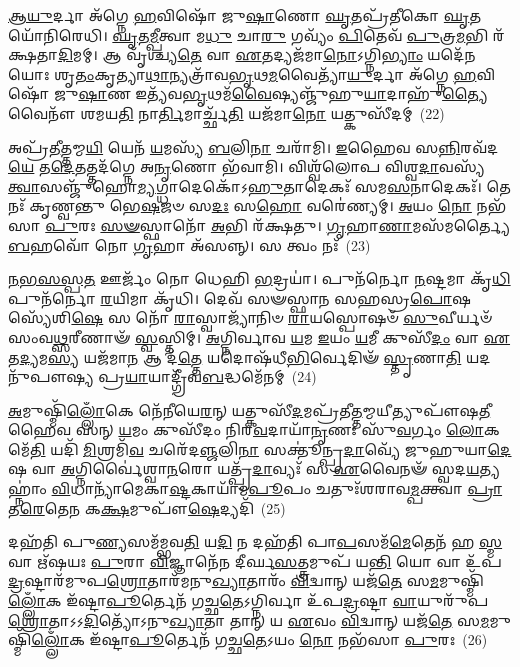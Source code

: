 \-\ul{𑌆}\-\-\ul{𑌯𑍁}\-𑌰𑍍𑌦𑌾 𑌅᳴𑌗𑍍𑌨𑍇 \ul{𑌹}\-𑌵𑌿𑌷𑍋᳴ 𑌜𑍁\-\ul{𑌷𑌾}\-𑌣𑍋 \ul{𑌘𑍃}\-𑌤𑌪𑍍𑌰᳴𑌤𑍀𑌕𑍋 \ul{𑌘𑍃}\-𑌤𑌯𑍋᳴𑌨𑌿𑌰𑍇𑌧𑌿। \ul{𑌘𑍃}\-𑌤\-\ul{𑌮𑍍𑌪𑍀}\-𑌤𑍍𑌵𑌾 𑌮\-\ul{𑌧𑍁} 𑌚𑌾\-\ul{𑌰𑍁} 𑌗𑌵𑍍𑌯𑌂᳴ \ul{𑌪𑌿}\-𑌤𑍇𑌵᳴ \ul{𑌪𑍁}\-𑌤𑍍𑌰\-\ul{𑌮}\-𑌭𑌿 𑌰᳴𑌕𑍍𑌷𑌤𑌾\-\ul{𑌦𑌿}\-𑌮𑌮𑍍। 𑌆 𑌵𑍃᳴𑌶𑍍𑌚𑍍𑌯\-\ul{𑌤𑍇} 𑌵𑌾 \ul{𑌏}\-𑌤𑌦𑍍𑌯𑌜᳴𑌮𑌾\-\ul{𑌨𑍋}\-\-𑌽𑌗𑍍𑌨𑌿\-\ul{𑌭𑍍𑌯𑌾𑌂} 𑌯𑌦𑍇᳴𑌨𑌯𑍋𑌃 𑌶𑍃\-\ul{𑌤𑌂}\-𑌕𑍃𑌤𑍍𑌯𑌾\-\ul{𑌥𑌾}\-𑌨𑍍𑌯𑌤𑍍𑌰𑌾᳴𑌵\-\ul{𑌭𑍃}\-𑌥\-\ul{𑌮}\-𑌵𑍈𑌤𑍍𑌯𑌾᳴\-\ul{𑌯𑍁}\-𑌰𑍍𑌦𑌾 𑌅᳴𑌗𑍍𑌨𑍇 \ul{𑌹}\-𑌵𑌿𑌷𑍋᳴ 𑌜𑍁\-\ul{𑌷𑌾}\-𑌣 𑌇𑌤𑍍𑌯᳴𑌵\-\ul{𑌭𑍃}\-𑌥𑌮᳴\-\ul{𑌵𑍈}\-𑌷𑍍𑌯𑌞𑍍𑌜𑍁᳴𑌹𑍁\-\ul{𑌯𑌾}\-𑌦𑌾𑌹𑍁᳴\-\ul{𑌤𑍍𑌯𑍈}\-𑌵𑍈𑌨𑍗᳴ 𑌶𑌮𑌯\-\ul{𑌤𑌿} 𑌨𑌾\-\ul{𑌰𑍍𑌤𑌿}\-𑌮𑌾𑌰𑍍𑌚𑍍𑌛᳴\-\ul{𑌤𑌿} 𑌯𑌜᳴𑌮𑌾\-\ul{𑌨𑍋} 𑌯𑌤𑍍𑌕𑍁𑌸𑍀᳴𑌦𑌮𑍍~(22)

𑌅𑌪𑍍𑌰᳴𑌤𑍀\-\ul{𑌤𑍍𑌤}\-𑌮𑍍𑌮\-\ul{𑌯𑌿} 𑌯𑍇𑌨᳴ \ul{𑌯}\-𑌮𑌸𑍍𑌯᳴ \ul{𑌬}\-𑌲𑌿\-\ul{𑌨𑌾} 𑌚𑌰𑌾᳴𑌮𑌿। \ul{𑌇}\-𑌹𑍈𑌵 𑌸\-\ul{𑌨𑍍𑌨𑌿}\-𑌰𑌵᳴𑌦\-\ul{𑌯𑍇} 𑌤\-\ul{𑌦𑍇}\-𑌤𑌤𑍍𑌤𑌦᳴𑌗𑍍𑌨𑍇 𑌅\-\ul{𑌨𑍃}\-𑌣𑍋 𑌭᳴𑌵𑌾𑌮𑌿। 𑌵𑌿𑌶𑍍𑌵᳴𑌲𑍋𑌪 𑌵𑌿𑌶𑍍𑌵\-\ul{𑌦𑌾}\-𑌵𑌸𑍍𑌯᳴ \ul{𑌤𑍍𑌵𑌾}\-𑌸𑌞𑍍𑌜𑍁᳴𑌹𑍋\-\ul{𑌮𑍍𑌯}\-𑌗𑍍𑌧𑌾𑌦𑍇𑌕𑍋᳴\-𑌽\-\ul{𑌹𑍁}\-𑌤𑌾𑌦𑍇𑌕𑌃᳴ 𑌸𑌮\-\ul{𑌸}\-𑌨𑌾𑌦𑍇𑌕𑌃᳴। 𑌤𑍇 𑌨𑌃᳴ 𑌕𑍃𑌣𑍍𑌵𑌨𑍍𑌤𑍁 𑌭𑍇\-\ul{𑌷}\-𑌜𑍞 𑌸\-\ul{𑌦𑌃} 𑌸\-\ul{𑌹𑍋} 𑌵𑌰𑍇॑𑌣𑍍𑌯𑌮𑍍। \ul{𑌅}\-𑌯𑌂 \ul{𑌨𑍋} 𑌨𑌭᳴𑌸𑌾 \ul{𑌪𑍁}\-𑌰𑌃 \ul{𑌸}\-\-\ul{𑍟}\-𑌸𑍍𑌫𑌾𑌨𑍋᳴ \ul{𑌅}\-𑌭𑌿 𑌰᳴𑌕𑍍𑌷𑌤𑍁। \ul{𑌗𑍃}\-𑌹𑌾\-\ul{𑌣𑌾}\-𑌮𑌸᳴𑌮𑌰𑍍𑌤𑍍𑌯𑍈 \ul{𑌬}\-𑌹𑌵𑍋᳴ 𑌨𑍋 \ul{𑌗𑍃}\-𑌹𑌾 𑌅᳴𑌸𑌨𑍍𑌨𑍍। 𑌸 𑌤𑍍𑌵𑌂 𑌨𑌃᳴~(23)

\-\ul{𑌨}\-\-\ul{𑌭}\-\-\ul{𑌸}\-\-\ul{𑌸𑍍𑌪}\-\-\ul{𑌤} 𑌊𑌰𑍍𑌜𑌂᳴ 𑌨𑍋 𑌧𑍇𑌹𑌿 \ul{𑌭}\-𑌦𑍍𑌰𑌯𑌾॑। 𑌪𑍁𑌨᳴𑌰𑍍𑌨𑍋 \ul{𑌨}\-𑌷𑍍𑌟𑌮𑌾 𑌕𑍃᳴\-\ul{𑌧𑌿} 𑌪𑍁𑌨᳴𑌰𑍍𑌨𑍋 \ul{𑌰}\-𑌯𑌿𑌮𑌾 𑌕𑍃᳴𑌧𑌿। 𑌦𑍇𑌵᳴ 𑌸𑍟𑌸𑍍𑌫𑌾𑌨 𑌸𑌹𑌸𑍍𑌰\-\ul{𑌪𑍋}\-𑌷𑌸𑍍𑌯𑍇᳴𑌶𑌿\-\ul{𑌷𑍇} 𑌸 𑌨𑍋᳴ \ul{𑌰𑌾}\-𑌸𑍍𑌵𑌾𑌜𑍍𑌯𑌾᳴𑌨𑌿𑍞 \ul{𑌰𑌾}\-𑌯𑌸𑍍𑌪𑍋𑌷𑍞᳴ \ul{𑌸𑍁}\-𑌵𑍀𑌰𑍍𑌯𑍞᳴ 𑌸𑌂𑌵\-\ul{𑌥𑍍𑌸}\-𑌰𑍀𑌣𑌾𑍟᳴ \ul{𑌸𑍍𑌵}\-𑌸𑍍𑌤𑌿𑌮𑍍। \ul{𑌅}\-𑌗𑍍𑌨𑌿𑌰𑍍𑌵𑌾𑌵 \ul{𑌯}\-𑌮 \ul{𑌇}\-𑌯𑌂 \ul{𑌯}\-𑌮𑍀 𑌕𑍁𑌸𑍀᳴\-\ul{𑌦𑌂} 𑌵𑌾 \ul{𑌏}\-𑌤\-\ul{𑌦𑍍𑌯}\-𑌮\-\ul{𑌸𑍍𑌯} 𑌯𑌜᳴𑌮𑌾\-\ul{𑌨} 𑌆 𑌦᳴\-\ul{𑌤𑍍𑌤𑍇} 𑌯𑌦𑍋𑌷᳴𑌧𑍀\-\ul{𑌭𑌿}\-𑌰𑍍𑌵𑍇𑌦𑌿𑍟᳴ \ul{𑌸𑍍𑌤𑍃}\-𑌣𑌾\-\ul{𑌤𑌿} 𑌯𑌦𑌨𑍁᳴𑌪𑍗𑌷𑍍𑌯 𑌪𑍍𑌰\-\ul{𑌯𑌾}\-𑌯𑌾𑌦𑍍𑌗𑍍𑌰𑍀᳴𑌵\-\ul{𑌬}\-𑌦𑍍𑌧𑌮𑍇᳴𑌨𑌮𑍍~(24)

\-\ul{𑌅}\-𑌮𑍁𑌷𑍍𑌮𑌿᳴\-\ul{𑌲𑍍𑌲𑍋𑌁}\-𑌕𑍇 𑌨𑍇᳴𑌨𑍀𑌯𑍇\-\ul{𑌰}\-𑌨𑍍 𑌯𑌤𑍍𑌕𑍁𑌸𑍀᳴\-\ul{𑌦}\-𑌮𑌪𑍍𑌰᳴𑌤𑍀\-\ul{𑌤𑍍𑌤}\-𑌮𑍍𑌮𑌯𑍀𑌤𑍍𑌯𑍁𑌪𑍗᳴𑌷\-\ul{𑌤𑍀}\-𑌹𑍈𑌵 𑌸𑌨𑍍 \ul{𑌯}\-𑌮𑌂 𑌕𑍁𑌸𑍀᳴𑌦𑌂 𑌨𑌿𑌰\-\ul{𑌵}\-𑌦𑌾𑌯𑌾᳴\-\ul{𑌨𑍃}\-𑌣𑌃 𑌸𑍁᳴\-\ul{𑌵}\-𑌰𑍍𑌗𑌂 \ul{𑌲𑍋}\-𑌕𑌮𑍇᳴\-\ul{𑌤𑌿} 𑌯𑌦𑌿᳴ \ul{𑌮𑌿}\-𑌶𑍍𑌰𑌮𑌿᳴\-\ul{𑌵} 𑌚𑌰𑍇᳴𑌦\-\ul{𑌞𑍍𑌜}\-𑌲𑌿\-\ul{𑌨𑌾} 𑌸𑌕𑍍𑌤𑍂॑𑌨𑍍𑌪𑍍𑌰\-\ul{𑌦𑌾}\-𑌵𑍍𑌯𑍇᳴ 𑌜𑍁𑌹𑍁𑌯𑌾\-\ul{𑌦𑍇}\-𑌷 𑌵𑌾 \ul{𑌅}\-𑌗𑍍𑌨𑌿𑌰𑍍𑌵𑍈॑𑌶𑍍𑌵𑌾\-\ul{𑌨}\-𑌰𑍋 𑌯𑌤𑍍𑌪𑍍𑌰᳴\-\ul{𑌦𑌾}\-𑌵𑍍𑌯𑌃᳴ 𑌸 \ul{𑌏}\-𑌵𑍈𑌨𑍟᳴ 𑌸𑍍𑌵𑌦\-\ul{𑌯}\-𑌤𑍍𑌯𑌹𑍍𑌨𑌾𑌂॑ \ul{𑌵𑌿}\-𑌧𑌾𑌨𑍍𑌯𑌾᳴𑌮𑍇𑌕𑌾\-\ul{𑌷𑍍𑌟}\-𑌕𑌾𑌯𑌾᳴𑌮\-\ul{𑌪𑍂}\-𑌪𑌂 𑌚𑌤𑍁𑌃᳴𑌶𑌰𑌾𑌵\-\ul{𑌮𑍍𑌪}\-𑌕𑍍𑌤𑍍𑌵𑌾 \ul{𑌪𑍍𑌰𑌾}\-𑌤\-\ul{𑌰𑍇}\-𑌤𑍇\-\ul{𑌨} 𑌕\-\ul{𑌕𑍍𑌷}\-𑌮𑍁𑌪𑍗᳴\-\ul{𑌷𑍇}\-𑌦𑍍𑌯𑌦𑌿᳴~(25)

𑌦𑌹᳴𑌤𑌿 𑌪𑍁\-\ul{𑌣𑍍𑌯}\-𑌸𑌮᳴𑌮𑍍𑌭𑌵\-\ul{𑌤𑌿} 𑌯\-\ul{𑌦𑌿} 𑌨 𑌦𑌹᳴𑌤𑌿 𑌪𑌾\-\ul{𑌪}\-𑌸𑌮᳴\-\ul{𑌮𑍇}\-𑌤𑍇𑌨᳴ 𑌹 \ul{𑌸𑍍𑌮} 𑌵𑌾 𑌋᳴𑌷𑌯𑌃 \ul{𑌪𑍁}\-𑌰𑌾 \ul{𑌵𑌿}\-𑌜𑍍𑌞𑌾𑌨𑍇᳴𑌨 𑌦𑍀𑌰𑍍𑌘\-\ul{𑌸}\-𑌤𑍍𑌤𑍍𑌰𑌮𑍁𑌪᳴ 𑌯\-\ul{𑌨𑍍𑌤𑌿} 𑌯𑍋 𑌵𑌾 𑌉᳴𑌪\-\ul{𑌦𑍍𑌰}\-𑌷𑍍𑌟𑌾𑌰᳴𑌮𑍁𑌪\-\ul{𑌶𑍍𑌰𑍋}\-𑌤𑌾𑌰᳴𑌮𑌨𑍁\-\ul{𑌖𑍍𑌯𑌾}\-𑌤𑌾𑌰𑌂᳴ \ul{𑌵𑌿}\-𑌦𑍍𑌵𑌾𑌨𑍍 𑌯𑌜᳴\-\ul{𑌤𑍇} 𑌸\-\ul{𑌮}\-𑌮𑍁𑌷𑍍𑌮𑌿᳴\-\ul{𑌲𑍍𑌲𑍋𑌁}\-𑌕 𑌇᳴𑌷𑍍𑌟𑌾\-\ul{𑌪𑍂}\-𑌰𑍍𑌤𑍇𑌨᳴ 𑌗𑌚𑍍𑌛\-\ul{𑌤𑍇}\-\-𑌽𑌗𑍍𑌨𑌿𑌰𑍍𑌵𑌾 𑌉᳴𑌪\-\ul{𑌦𑍍𑌰}\-𑌷𑍍𑌟𑌾 \ul{𑌵𑌾}\-𑌯𑍁𑌰𑍁᳴𑌪\-\ul{𑌶𑍍𑌰𑍋}\-𑌤𑌾\-𑌽\-𑌽\-\-\ul{𑌦𑌿}\-𑌤𑍍𑌯𑍋᳴\-𑌽𑌨𑍁\-\ul{𑌖𑍍𑌯𑌾}\-𑌤𑌾 𑌤𑌾𑌨𑍍 𑌯 \ul{𑌏}\-𑌵𑌂 \ul{𑌵𑌿}\-𑌦𑍍𑌵𑌾𑌨𑍍 𑌯𑌜᳴\-\ul{𑌤𑍇} 𑌸\-\ul{𑌮}\-𑌮𑍁𑌷𑍍𑌮𑌿᳴\-\ul{𑌲𑍍𑌲𑍋𑌁}\-𑌕 𑌇᳴𑌷𑍍𑌟𑌾\-\ul{𑌪𑍂}\-𑌰𑍍𑌤𑍇𑌨᳴ 𑌗𑌚𑍍𑌛\-\ul{𑌤𑍇}\-\-𑌽𑌯𑌂 \ul{𑌨𑍋} 𑌨𑌭᳴𑌸𑌾 \ul{𑌪𑍁}\-𑌰𑌃~(26)

